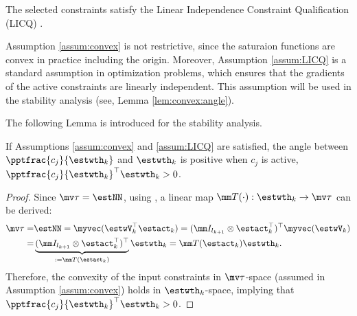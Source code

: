 \documentclass[lettersize,journal]{IEEEtran}
\begin{document}
\begin{assum}
    The selected constraints satisfy the Linear Independence Constraint Qualification (LICQ) \cite[Chap.~12 Def.~12.1]{Nocedal:2006aa}.
    \label{assum:LICQ}
\end{assum}

\begin{remark}
    Assumption \ref{assum:convex} is not restrictive, since the saturaion functions are convex in practice including the origin.
    Moreover, Assumption \ref{assum:LICQ} is a standard assumption in optimization problems, which ensures that the gradients of the active constraints are linearly independent.
    This assumption will be used in the stability analysis (see, Lemma \ref{lem:convex:angle}).
\end{remark}

The following Lemma is introduced for the stability analysis.
\begin{lem}
    If Assumptions \ref{assum:convex} and \ref{assum:LICQ} are satisfied, the angle between $\pptfrac{c_j}{\estwth_k}$ and $\estwth_k$ is positive when $c_j$ is active, \ie $\pptfrac{c_j}{\estwth_k}^\top\estwth_k>0$.
    \label{lem:convex:angle}
\end{lem}

\begin{proof}

Since $\mv\tau = \estNN$, using \cite[Proposition 7.1.9]{Bernstein:2009aa}, a linear map $\mm T(\cdot):\estwth_k\to\mv\tau$ can be derived: 
\begin{equation}\label{eq:linear:map}
    \begin{aligned}
    \mv\tau 
    = 
    &
    \estNN 
    =
    \myvec(
        \estwV_k^\top \estact_k
    ) 
    = 
    (
        \mm I_{l_{k+1}}
        \otimes 
        \estact_k^\top
    )^\top
    \myvec(\estwV_k)
    \\
    = &
    \underbrace{
        (
        \mm I_{l_{k+1}}
        \otimes 
        \estact_k^\top
    )^\top}_{:=\mm T(\estact_k)}
    \estwth_k 
    =
    \mm T(\estact_k) \estwth_k.
    \end{aligned}
\end{equation}
Therefore, the convexity of the input constraints in $\mv\tau$-space (assumed in Assumption \ref{assum:convex}) holds in $\estwth_k$-space, implying
that $\pptfrac{c_j}{\estwth_k}^\top\estwth_k>0$.

\end{proof}
\end{document}
